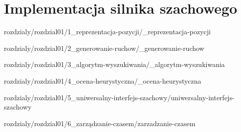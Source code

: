\chapter {Implementacja silnika szachowego}
\label {ch: implementacja-silnika-szachowego}

 {rozdzialy/rozdzial01/1_reprezentacja-pozycji/_reprezentacja-pozycji}

 {rozdzialy/rozdzial01/2_generowanie-ruchow/_generowanie-ruchow}

 {rozdzialy/rozdzial01/3_algorytm-wyszukiwania/_algorytm-wyszukiwania}

 {rozdzialy/rozdzial01/4_ocena-heurystyczna/_ocena-heurystyczna}

 {rozdzialy/rozdzial01/5_uniwersalny-interfejs-szachowy/uniwersalny-interfejs-szachowy}

 {rozdzialy/rozdzial01/6_zarządzanie-czasem/zarzadzanie-czasem}